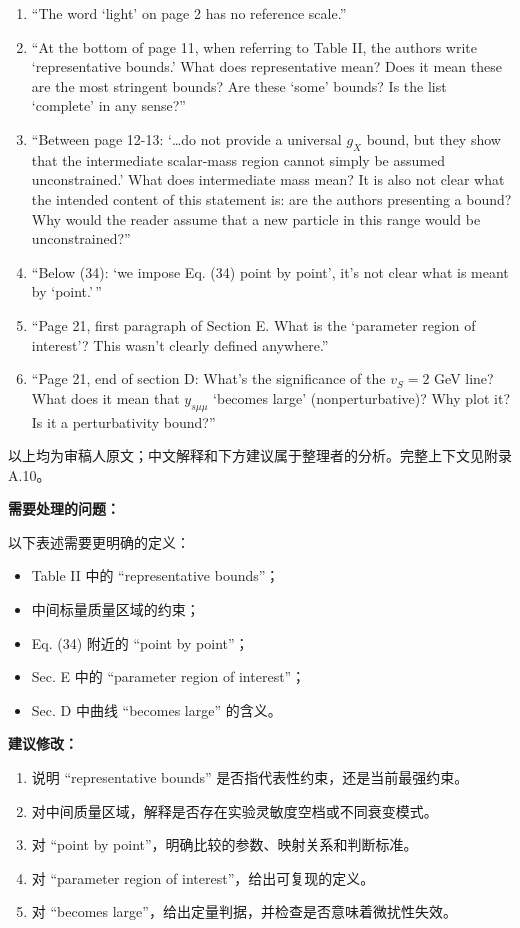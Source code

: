 \documentclass[
]{article}
\providecommand{\tightlist}{%
  \setlength{\itemsep}{0pt}\setlength{\parskip}{0pt}}
\begin{document}
\begin{enumerate}
\def\labelenumi{\arabic{enumi}.}
\tightlist
\item
  ``The word `light' on page 2 has no reference scale.''
\item
  ``At the bottom of page 11, when referring to Table II, the authors
  write `representative bounds.' What does representative mean? Does it
  mean these are the most stringent bounds? Are these `some' bounds? Is
  the list `complete' in any sense?''
\item
  ``Between page 12-13: `\ldots do not provide a universal \(g_X\)
  bound, but they show that the intermediate scalar-mass region cannot
  simply be assumed unconstrained.' What does intermediate mass mean? It
  is also not clear what the intended content of this statement is: are
  the authors presenting a bound? Why would the reader assume that a new
  particle in this range would be unconstrained?''
\item
  ``Below (34): `we impose Eq. (34) point by point', it's not clear what
  is meant by `point.'\,''
\item
  ``Page 21, first paragraph of Section E. What is the `parameter region
  of interest'? This wasn't clearly defined anywhere.''
\item
  ``Page 21, end of section D: What's the significance of the \(v_S=2\)
  GeV line? What does it mean that \(y_{s\mu\mu}\) `becomes large'
  (nonperturbative)? Why plot it? Is it a perturbativity bound?''
\end{enumerate}

以上均为审稿人原文；中文解释和下方建议属于整理者的分析。完整上下文见附录
A.10。

\textbf{需要处理的问题：}

以下表述需要更明确的定义：

\begin{itemize}
\tightlist
\item
  Table II 中的 ``representative bounds''；
\item
  中间标量质量区域的约束；
\item
  Eq. (34) 附近的 ``point by point''；
\item
  Sec. E 中的 ``parameter region of interest''；
\item
  Sec. D 中曲线 ``becomes large'' 的含义。
\end{itemize}

\textbf{建议修改：}

\begin{enumerate}
\def\labelenumi{\arabic{enumi}.}
\tightlist
\item
  说明 ``representative bounds'' 是否指代表性约束，还是当前最强约束。
\item
  对中间质量区域，解释是否存在实验灵敏度空档或不同衰变模式。
\item
  对 ``point by point''，明确比较的参数、映射关系和判断标准。
\item
  对 ``parameter region of interest''，给出可复现的定义。
\item
  对 ``becomes large''，给出定量判据，并检查是否意味着微扰性失效。
\end{enumerate}
\end{document}
